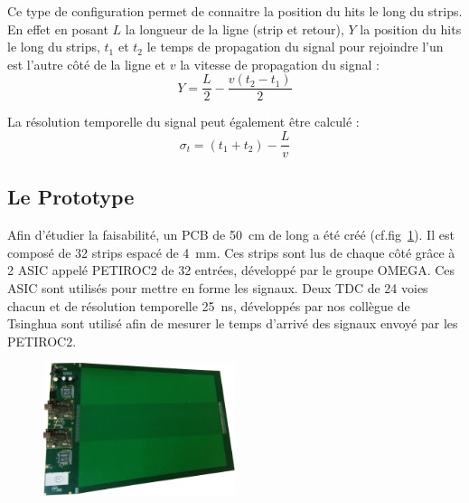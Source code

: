 Ce type de configuration permet de connaitre la position du hits le long du strips. En effet en posant $L$ la longueur de la ligne (strip et retour), $Y$ la position du hits le long du strips, $t_1$ et $t_2$ le temps de propagation du signal pour rejoindre l'un est l'autre côté de la ligne et $v$ la vitesse de propagation du signal :
\begin{equation}
Y=\frac{L}{2}-\frac{v(t_2-t_1)}{2}
\end{equation} 

La résolution temporelle du signal peut également être calculé :
\begin{equation}
\sigma_{t}=(t_1+t_2)-\frac{L}{v}
\end{equation}

\subsection{Le Prototype}
Afin d'étudier la faisabilité, un PCB de \SI{50}{\centi\meter} de long a été créé (cf.fig~\ref{PCB2}). Il est composé de \num{32} strips espacé de \SI{4}{\milli\meter}. Ces strips sont lus de chaque côté grâce à \num{2} ASIC appelé PETIROC2 \cite{Monzo:2017quz} de \num{32} entrées, développé par le groupe OMEGA. Ces ASIC sont utilisés pour mettre en forme les signaux. Deux TDC de \num{24} voies chacun et de résolution temporelle \SI{25}{\nano\second}, développés par nos collègue de Tsinghua sont utilisé afin de mesurer le temps d'arrivé des signaux envoyé par les PETIROC2.

\begin{figure}[ht!]
	\centering
	\includegraphics[width=0.50\textwidth]{ELE/PCB2.png}
	\label{PCB2}
\end{figure}

